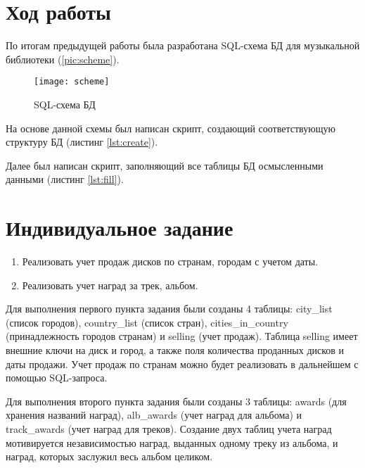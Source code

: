 \section{Ход работы}

По итогам предыдущей работы была разработана SQL-схема БД для музыкальной библиотеки (\vref{pic:scheme}).

\begin{figure}[ht]
	\centering
	\texttt{[image: scheme]}
	\caption{SQL-схема БД}
	\label{pic:scheme}
\end{figure}

На основе данной схемы был написан скрипт, создающий соответствующую структуру БД (листинг \vref{lst:create}).



Далее был написан скрипт, заполняющий все таблицы БД осмысленными данными (листинг \vref{lst:fill}).



\section{Индивидуальное задание}

\begin{enumerate}
	\item Реализовать учет продаж дисков по странам, городам с учетом даты.
	\item Реализовать учет наград за трек, альбом.
\end{enumerate}

Для выполнения первого пункта задания были созданы 4 таблицы: city\_list (список городов), country\_list (список стран), cities\_in\_country (принадлежность городов странам) и selling (учет продаж). Таблица selling имеет внешние ключи на диск и город, а также поля количества проданных дисков и даты продажи. Учет продаж по странам можно будет реализовать в дальнейшем с помощью SQL-запроса.

Для выполнения второго пункта задания были созданы 3 таблицы: awards (для хранения названий наград), alb\_awards (учет наград для альбома) и track\_awards (учет наград для треков). Создание двух таблиц учета наград мотивируется независимостью наград, выданных одному треку из альбома, и наград, которых заслужил весь альбом целиком. \\

